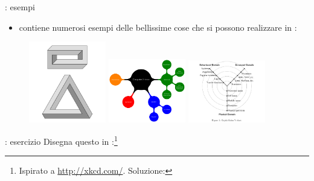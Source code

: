 \documentclass{beamer}
\begin{document}
\begin{frame}[fragile]{\insertsection: esempi}
\begin{itemize}
\item {} contiene numerosi esempi delle bellissime cose che si possono realizzare in \tikzname{}:
\end{itemize}
\begin{figure}
\href{http://texample.net/tikz/examples/escher-brick-penrose-triangle/}{%
  \includegraphics[width=0.3\textwidth]{escher-brick-penrose-triangle}}
\href{http://texample.net/tikz/examples/computer-science-mindmap/}{%
  \includegraphics[width=0.3\textwidth]{computer-science-mindmap}}
\href{http://texample.net/tikz/examples/gajski-kuhn-y-chart/}{%
  \includegraphics[width=0.3\textwidth]{gajski-kuhn-y-chart}}
\end{figure}
\end{frame}

\begin{frame}[fragile]{\insertsection: esercizio}
Disegna questo in \tikzname:\footnote{Ispirato a \url{http://xkcd.com/}. Soluzione: }
\begin{figure}

\end{figure}
\end{frame}
\end{document}
